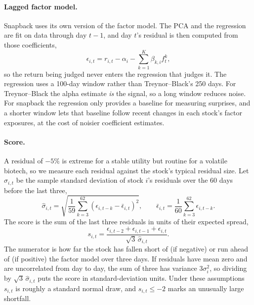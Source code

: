 \documentclass[12pt,letterpaper]{article}
\begin{document}
\paragraph{Lagged factor model.} Snapback uses its own version of the factor model. The PCA and the regression are fit on data through day $t-1$, and day $t$'s residual is then computed from those coefficients,
\[
    \epsilon_{i,t} = r_{i,t} - \alpha_i - \sum_{k=1}^{K} \beta_{k,i} f^k_t ,
\]
so the return being judged never enters the regression that judges it. The regression uses a 100-day window rather than Treynor--Black's 250 days. For Treynor--Black the alpha estimate \emph{is} the signal, so a long window reduces noise. For snapback the regression only provides a baseline for measuring surprises, and a shorter window lets that baseline follow recent changes in each stock's factor exposures, at the cost of noisier coefficient estimates.

\paragraph{Score.} A residual of $-5\%$ is extreme for a stable utility but routine for a volatile biotech, so we measure each residual against the stock's typical residual size. Let $\hat\sigma_{i,t}$ be the sample standard deviation of stock $i$'s residuals over the 60 days before the last three,
\[
    \hat\sigma_{i,t} = \sqrt{\frac{1}{59} \sum_{k=3}^{62} \left(\epsilon_{i,t-k} - \bar\epsilon_{i,t}\right)^2},
    \qquad
    \bar\epsilon_{i,t} = \frac{1}{60} \sum_{k=3}^{62} \epsilon_{i,t-k} .
\]
The score is the sum of the last three residuals in units of their expected spread,
\[
    s_{i,t} = \frac{\epsilon_{i,t-2} + \epsilon_{i,t-1} + \epsilon_{i,t}}{\sqrt{3}\, \hat\sigma_{i,t}} .
\]
The numerator is how far the stock has fallen short of (if negative) or run ahead of (if positive) the factor model over three days. If residuals have mean zero and are uncorrelated from day to day, the sum of three has variance $3\sigma_i^2$, so dividing by $\sqrt{3}\,\hat\sigma_{i,t}$ puts the score in standard-deviation units. Under these assumptions $s_{i,t}$ is roughly a standard normal draw, and $s_{i,t} \le -2$ marks an unusually large shortfall.
\end{document}
